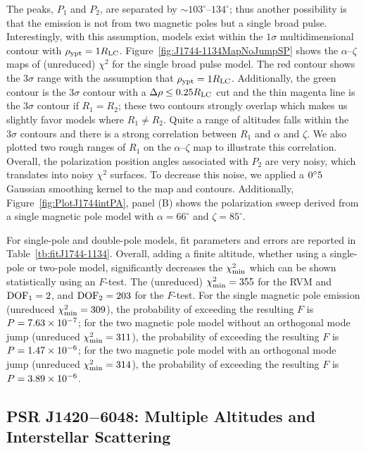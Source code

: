 The peaks, $P_1$ and $P_2$, are separated by $\sim 103^{\circ}$--$134^{\circ}$; thus another possibility is that the emission
is not from two magnetic poles but a single broad pulse.  Interestingly, with this assumption,
models exist within the $1\sigma$ multidimensional contour with $\rho_{\rm{ypt}}=1R_{\rm{LC}}$.
Figure~\ref{fig:J1744-1134MapNoJumpSP} shows the $\alpha$--$\zeta$ maps of (unreduced) $\chi^2$
for the single broad pulse model.  The red contour shows the $3\sigma$ range with the 
assumption that $\rho_{\rm{ypt}}=1R_{\rm{LC}}$. Additionally, the green contour is the $3\sigma$
contour with a $\Delta \rho \leq 0.25R_{\rm{LC}}$ cut and the thin magenta line is the $3\sigma$
contour if $R_1=R_2$; these two contours strongly overlap which makes us slightly favor models
where $R_1\neq R_2$.  Quite a range of altitudes falls 
within the $3\sigma$ contours and there is
a strong correlation between $R_1$ and $\alpha$ and $\zeta$.  We also plotted two rough ranges
of $R_1$ on the $\alpha$--$\zeta$ map to illustrate this correlation.
Overall, the polarization position angles associated 
with $P_2$ are very noisy, which translates
into noisy $\chi^2$ surfaces.  To decrease this noise, 
we applied a $0\hbox{$^\circ$}5$ Gaussian smoothing kernel
to the map and contours.  Additionally, Figure~\ref{fig:PlotJ1744intPA},
panel (B) shows the polarization sweep derived from a
single magnetic pole model with $\alpha=66^\circ$ and $\zeta=85^\circ$.

For single-pole and double-pole models, fit parameters and errors are reported in Table~\ref{tb:fitJ1744-1134}.
Overall, adding a finite altitude, whether using 
a single-pole or two-pole model, significantly decreases the $\chi^2_{\rm{min}}$
which can be shown statistically using an $F$-test.  
The (unreduced) $\chi^2_{\rm{min}}=355$ for the RVM and $\rm{DOF}_1=2$, and $\rm{DOF}_2=203$
for the $F$-test.  For the single magnetic pole emission 
(unreduced $\chi^2_{\rm{min}}=309$), the probability of exceeding the resulting $F$ is $P=7.63\times 10^{-7}$;
for the two magnetic pole model without 
an orthogonal mode jump (unreduced $\chi^2_{\rm{min}}=311$), 
the probability of exceeding the resulting $F$ is 
$P=1.47\times 10^{-6}$; for the two magnetic pole model 
with an orthogonal mode jump (unreduced $\chi^2_{\rm{min}}=314$), the probability of 
exceeding the resulting $F$ is $P=3.89\times 10^{-6}$.


\subsection{PSR J1420$-$6048: Multiple Altitudes and Interstellar Scattering}
\label{sec:J1420}

